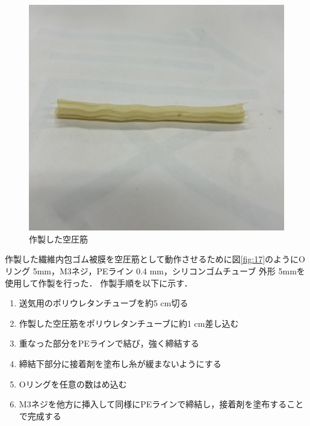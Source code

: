 \begin{figure}[h]
  \centering  %
  \includegraphics[scale=0.3]{pic/16.jpg}
  \caption{作製した空圧筋}
  \label{fig:16}
\end{figure}
\newpage
作製した繊維内包ゴム被膜を空圧筋として動作させるために図\ref{fig:17}のようにOリング 5mm，M3ネジ，PEライン 0.4 mm，シリコンゴムチューブ 外形 5mmを使用して作製を行った．
作製手順を以下に示す．
\begin{enumerate}
  \item 送気用のポリウレタンチューブを約5 cm切る
  \item 作製した空圧筋をポリウレタンチューブに約1 cm差し込む
  \item 重なった部分をPEラインで結び，強く締結する
  \item 締結下部分に接着剤を塗布し糸が緩まないようにする
  \item Oリングを任意の数はめ込む
  \item M3ネジを他方に挿入して同様にPEラインで締結し，接着剤を塗布することで完成する
\end{enumerate}
